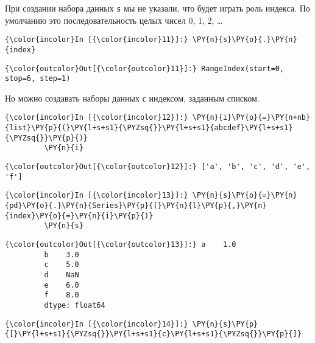     При создании набора данных \texttt{s} мы не указали, что будет играть
роль индекса. По умолчанию это последовательность целых чисел 0, 1, 2,
\ldots{}

    \begin{Verbatim}[commandchars=\\\{\}]
{\color{incolor}In [{\color{incolor}11}]:} \PY{n}{s}\PY{o}{.}\PY{n}{index}
\end{Verbatim}

            \begin{Verbatim}[commandchars=\\\{\}]
{\color{outcolor}Out[{\color{outcolor}11}]:} RangeIndex(start=0, stop=6, step=1)
\end{Verbatim}
        
    Но можно создавать наборы данных с индексом, заданным списком.

    \begin{Verbatim}[commandchars=\\\{\}]
{\color{incolor}In [{\color{incolor}12}]:} \PY{n}{i}\PY{o}{=}\PY{n+nb}{list}\PY{p}{(}\PY{l+s+s1}{\PYZsq{}}\PY{l+s+s1}{abcdef}\PY{l+s+s1}{\PYZsq{}}\PY{p}{)}
         \PY{n}{i}
\end{Verbatim}

            \begin{Verbatim}[commandchars=\\\{\}]
{\color{outcolor}Out[{\color{outcolor}12}]:} ['a', 'b', 'c', 'd', 'e', 'f']
\end{Verbatim}
        
    \begin{Verbatim}[commandchars=\\\{\}]
{\color{incolor}In [{\color{incolor}13}]:} \PY{n}{s}\PY{o}{=}\PY{n}{pd}\PY{o}{.}\PY{n}{Series}\PY{p}{(}\PY{n}{l}\PY{p}{,}\PY{n}{index}\PY{o}{=}\PY{n}{i}\PY{p}{)}
         \PY{n}{s}
\end{Verbatim}

            \begin{Verbatim}[commandchars=\\\{\}]
{\color{outcolor}Out[{\color{outcolor}13}]:} a    1.0
         b    3.0
         c    5.0
         d    NaN
         e    6.0
         f    8.0
         dtype: float64
\end{Verbatim}
        
    \begin{Verbatim}[commandchars=\\\{\}]
{\color{incolor}In [{\color{incolor}14}]:} \PY{n}{s}\PY{p}{[}\PY{l+s+s1}{\PYZsq{}}\PY{l+s+s1}{c}\PY{l+s+s1}{\PYZsq{}}\PY{p}{]}
\end{Verbatim}

